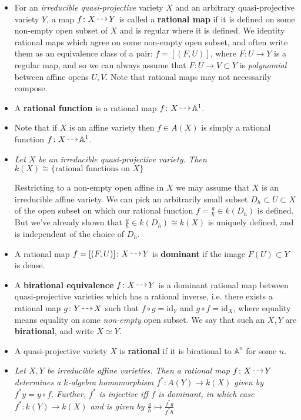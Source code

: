 \documentclass[10pt]{article}
\newcommand{\id}{\mathrm{id}}
\newcommand{\aff}{\mathbb{A}}
\newcommand*{\DashedArrow}[1][]{\mathbin{\tikz [baseline=-0.25ex,-latex, densely dashed,#1] \draw [#1] (0pt,0.5ex) -- (1.3em,0.5ex);}}
\newcommand{\ratmap}{{\,\DashedArrow[->]\,}}
\begin{document}
            \begin{itemize}
                \item For an \emph{irreducible quasi-projective} variety $X$ and an arbitrary quasi-projective variety $Y$, a map $f\colon X\ratmap Y$ is called a \textbf{rational map} if it is defined on some non-empty open subset of $X$ and is regular where it is defined.
                    We identity rational maps which agree on some non-empty open subset, and often write them as an equivalence class of a pair: $f=[(F,U)]$, where $F\colon U\to Y$ is a regular map, and so we can always assume that $F\colon U\to V\subset Y$ is \emph{polynomial} between affine opens $U,V$.
                    Note that rational maps may not necessarily compose.
                \item A \textbf{rational function} is a rational map $f\colon X\ratmap\aff^1$.
                \item Note that if $X$ is an affine variety then $f\in A(X)$ is simply a rational function $f\colon X\ratmap\aff^1$.
                \item \emph{Let $X$ be an irreducible quasi-projective variety.}
                    \emph{Then $k(X)\cong\{\text{rational functions on $X$}\}$}

                    Restricting to a non-empty open affine in $X$ we may assume that $X$ is an irreducible affine variety.
                    We can pick an arbitrarily small subset $D_h\subset U\subset X$ of the open subset on which our rational function $f=\frac{g}{h}\in k(D_h)$ is defined.
                    But we've already shown that $\frac{g}{h}\in k(D_h)\cong k(X)$ is uniquely defined, and is independent of the choice of $D_h$.

                \item A rational map $f=[(F,U)]\colon X\ratmap Y$ is \textbf{dominant} if the image $F(U)\subset Y$ is dense.
                \item A \textbf{birational equivalence} $f\colon X\ratmap Y$ is a dominant rational map between quasi-projective varieties which has a rational inverse, i.e. there exists a rational map $g\colon Y\ratmap X$ such that $f\circ g=\id_Y$ and $g\circ f=\id_X$, where equality means equality on some \emph{non-empty} open subset.
                    We say that such an $X,Y$ are \textbf{birational}, and write $X\simeq Y$.
                \item A quasi-projective variety $X$ is \textbf{rational} if it is birational to $\aff^n$ for some $n$.
                \item \emph{Let $X,Y$ be \emph{irreducible affine} varieties.}
                    \emph{Then a rational map $f\colon X\ratmap Y$ determines a $k$-algebra homomorphism $f^*\colon A(Y)\to k(X)$ given by $f^*y=y\circ f$.}
                    \emph{Further, $f^*$ is injective iff $f$ is dominant, in which case $f^*\colon k(Y)\to k(X)$ and is given by $\frac{g}{h}\mapsto\frac{f^*g}{f^*h}$}


\end{itemize}
\end{document}
